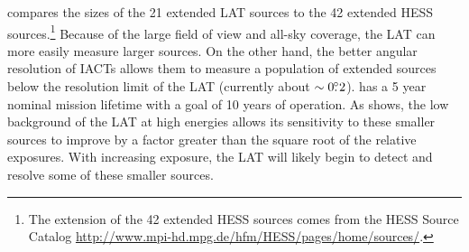  compares the sizes of the 21 extended
LAT sources to the 42 extended \ac{HESS} sources.\footnote{The 
\tev extension of
the 42 extended \ac{HESS} sources comes from the \ac{HESS} Source
Catalog \url{http://www.mpi-hd.mpg.de/hfm/HESS/pages/home/sources/}.}
Because of the large
field of view and all-sky coverage, the LAT can more easily measure
larger sources.  On the other hand, the 
better
angular resolution of \acp{IACT} allows them to measure a
population of extended sources below the resolution limit of the LAT (currently 
about $\sim0\mbox{$.\!\!^\circ$}2$).  \fermi has a 5 year nominal mission lifetime with
a goal of 10 years of operation.  As  shows,
the low background of the LAT at high energies allows its sensitivity 
to
these smaller sources to improve by a factor greater than the square root
of the relative exposures.  With increasing exposure, the LAT will likely begin to
detect and resolve some of these smaller \tev sources.

